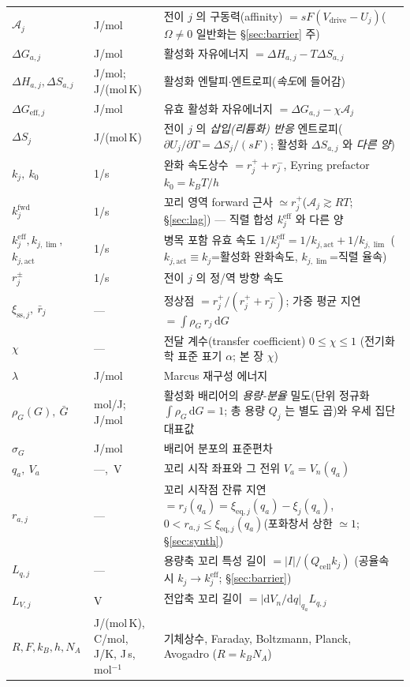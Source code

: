 \documentclass[11pt,a4paper]{article}
\newcommand{\dd}{\mathrm{d}}
\newcommand{\eff}{\mathrm{eff}}
\newcommand{\eq}{\mathrm{eq}}
\newcommand{\drive}{\mathrm{drive}}
\newcommand{\cell}{\mathrm{cell}}
\newcommand{\sstat}{\mathrm{ss}}
\begin{document}
\begin{longtable}{p{} p{} p{}}
$\mathcal A_j$ & J/mol & 전이 $j$ 의 구동력(affinity) $=sF(V_\drive-U_j)$($\Omega\ne0$ 일반화는 \S\ref{sec:barrier} 주) \\
$\Delta G_{a,j}$ & J/mol & 활성화 자유에너지 $=\Delta H_{a,j}-T\Delta S_{a,j}$ \\
$\Delta H_{a,j},\Delta S_{a,j}$ & {\footnotesize J/mol;\,J/(mol\,K)} & 활성화 엔탈피$\cdot$엔트로피(\emph{속도}에 들어감) \\
$\Delta G_{\eff,j}$ & J/mol & 유효 활성화 자유에너지 $=\Delta G_{a,j}-\chi\mathcal A_j$ \\
$\Delta S_j$ & J/(mol\,K) & 전이 $j$ 의 \emph{삽입(리튬화) 반응} 엔트로피($\partial U_j/\partial T=\Delta S_j/(sF)$; 활성화 $\Delta S_{a,j}$ 와 \emph{다른 양}) \\
$k_j,\ k_0$ & 1/s & 완화 속도상수 $=r_j^++r_j^-$, Eyring prefactor $k_0=k_BT/h$ \\
$k_j^{\mathrm{fwd}}$ & 1/s & 꼬리 영역 forward 근사 $\simeq r_j^+$($\mathcal A_j\gtrsim RT$; \S\ref{sec:lag}) — 직렬 합성 $k_j^\eff$ 와 다른 양 \\
$k_j^{\eff},k_{j,\lim},$ $k_{j,\mathrm{act}}$ & 1/s & 병목 포함 유효 속도 $1/k_j^{\eff}=1/k_{j,\mathrm{act}}+1/k_{j,\lim}$ ($k_{j,\mathrm{act}}\!\equiv\!k_j$=활성화 완화속도, $k_{j,\lim}$=직렬 율속) \\
$r_j^\pm$ & 1/s & 전이 $j$ 의 정/역 방향 속도 \\
$\xi_{\sstat,j},\ \bar r_j$ & --- & 정상점 $=r_j^+/(r_j^++r_j^-)$; 가중 평균 지연 $=\int\rho_G\,r_j\,\dd G$ \\
$\chi$ & --- & 전달 계수(transfer coefficient) $0\le\chi\le1$ (전기화학 표준 표기 $\alpha$; 본 장 $\chi$) \\
$\lambda$ & J/mol & Marcus 재구성 에너지 \\
$\rho_G(G),\ \bar G$ & mol/J;\,J/mol & 활성화 배리어의 \emph{용량-분율} 밀도(단위 정규화 $\int\rho_G\,\dd G=1$; 총 용량 $Q_j$ 는 별도 곱)와 우세 집단 대표값 \\
$\sigma_G$ & J/mol & 배리어 분포의 표준편차 \\
$q_a,\ V_a$ & ---,\ V & 꼬리 시작 좌표와 그 전위 $V_a=V_n(q_a)$ \\
$r_{a,j}$ & --- & 꼬리 시작점 잔류 지연 $=r_j(q_a)=\xi_{\eq,j}(q_a)-\xi_j(q_a)$, $0<r_{a,j}\le\xi_{\eq,j}(q_a)$(포화창서 상한 $\simeq1$; \S\ref{sec:synth}) \\
$L_{q,j}$ & --- & 용량축 꼬리 특성 길이 $=|I|/(Q_\cell k_j)$ (공율속 시 $k_j\!\to\!k_j^{\eff}$; \S\ref{sec:barrier}) \\
$L_{V,j}$ & V & 전압축 꼬리 길이 $=|\dd V_n/\dd q|_{q_a}L_{q,j}$ \\
$R,F,k_B,h,N_A$ & {\footnotesize J/(mol\,K), C/mol, J/K, J\,s, mol$^{-1}$} & 기체상수, Faraday, Boltzmann, Planck, Avogadro ($R=k_BN_A$) \\
\bottomrule
\end{longtable}
\end{document}
